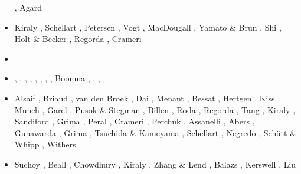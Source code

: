 \begin{scriptsize}
\begin{itemize}
                           \cite{robn16}\cite{mavm16}
                           \cite{magc16}\cite{marl16}
                           \cite{mesj16}\cite{jada16}
                           \cite{jada16b}\cite{liku16}
                           \cite{chss16}, Agard \etal \cite{agys16}
\item[\twothousandseventeen] Kiraly \etal \cite{kicf17}, Schellart \cite{sche17}, 
                             Petersen \etal \cite{pest17}, Vogt \etal \cite{vomc17}, 
                             MacDougall \etal \cite{majf17}, Yamato \& Brun \cite{yabr17}, 
                             Shi \etal \cite{shwl17}, Holt \& Becker \cite{hobe17}, 
                             Regorda \etal \cite{rerm17}, Crameri \etal \cite{crlt17}
\item[\twothousandeighteen] \cite{yamz18}\cite{crli18}
                            \cite{spcv18}\cite{chss18}
                            \cite{yagz18}\cite{mazh18}
                            \cite{pukp18}\cite{masg18}
                            \cite{biar18}
\item[\twothousandnineteen] \cite{magn19}, \cite{mavb19},
                            \cite{scvm19}, \cite{cakc19},
                            \cite{samo19}, \cite{sihf19},
                            \cite{meag19}, \cite{vaws19}, 
                            Boonma \etal \cite{bokg19}, \cite{vawg19},
                            \cite{cibi19}, \cite{pust19}
\item[\twothousandtwenty] Alsaif \etal \cite{algg20}, Briaud \etal \cite{braf20},
                          van den Broek \etal \cite{vamg20}, Dai \etal \cite{dawl20},
                          Menant \etal \cite{meag20}, Bessat \etal \cite{bedh20},
                          Hertgen \etal \cite{heyg20}, Kiss \etal \cite{kicd20},
                          Munch \etal \cite{mugu20}, Garel \etal \cite{gatt20},
                          Pusok \& Stegman \cite{pust20}, Billen \cite{bill20},
                          Roda \etal \cite{rozr20}, Regorda \etal \cite{relr20}, 
                          Tang \etal \cite{tacm20}, Kiraly \etal \cite{kiph20}, 
                          Sandiford \etal \cite{sams20}, Grima \etal \cite{grlc20}, 
                          Peral \etal \cite{perz20}, Crameri \etal \cite{crmd20}, 
                          Perchuk \etal \cite{pegz20}, Assanelli \etal \cite{aslr20}, 
                          Abers \etal \cite{abvw20}, Gunawarda \etal \cite{gumc20},
                          Grima \etal \cite{grlc20}, Tsuchida \& Kameyama \cite{tska20},
                          Schellart \cite{sche20}, Negredo \etal \cite{nemc20},
                          Sch{\"u}tt \& Whipp \cite{scwh20}, Withers \cite{with20}
\item[\twothousandtwentyone] Suchoy \etal \cite{sugm21}, Beall \etal \cite{befd21},
                             Chowdhury \etal \cite{chcg21}, Kiraly \etal \cite{kifc21},
                             Zhang \& Lend \cite{zhle21}, Balazs \etal \cite{bafu21},
                             Kerswell \etal \cite{kekg21}, Liu \etal \cite{ligl21b}
\end{itemize}
\end{scriptsize}

